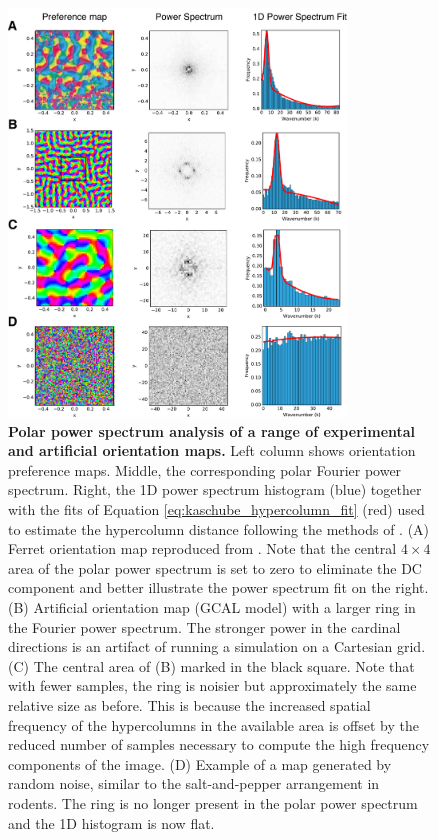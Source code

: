 \documentclass[phd,ianc,twoside]{infthesis}
\begin{document}
\begin{figure}
\centerline{
\includegraphics[width=0.8\textwidth]{./figures/fourier_rings.pdf}
}
\caption[]{{\bf Polar power spectrum analysis of a range of experimental
    and artificial orientation maps.} Left column shows orientation
  preference maps. Middle, the corresponding polar Fourier power
  spectrum. Right, the 1D power spectrum histogram (blue) together with
  the fits of Equation \ref{eq:kaschube_hypercolumn_fit} (red) used to
  estimate the hypercolumn distance following the methods of
  \citep{kaschube_science10}. (A) Ferret orientation map reproduced from
  \citet{chapman_jn96}. Note that the central $4\times4$ area of the
  polar power spectrum is set to zero to eliminate the DC component and
  better illustrate the power spectrum fit on the right.  (B) Artificial
  orientation map (GCAL model) with a larger ring in the Fourier power
  spectrum. The stronger power in the cardinal directions is an artifact
  of running a simulation on a Cartesian grid. (C) The central area of
  (B) marked in the black square. Note that with fewer samples, the ring
  is noisier but approximately the same relative size as before. This is
  because the increased spatial frequency of the hypercolumns in the
  available area is offset by the reduced number of samples necessary to
  compute the high frequency components of the image. (D) Example of a
  map generated by random noise, similar to the salt-and-pepper
  arrangement in rodents. The ring is no longer present in the polar
  power spectrum and the 1D histogram is now flat.}
\label{fig:fourier_ring}
\end{figure}
\end{document}
